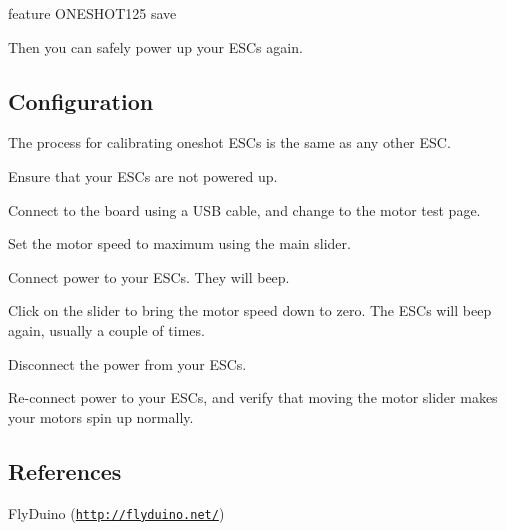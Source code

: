\begin{DoxyVerb}feature ONESHOT125
save
\end{DoxyVerb}


Then you can safely power up your E\+S\+Cs again.

\subsection*{Configuration}

The process for calibrating oneshot E\+S\+Cs is the same as any other E\+S\+C.


\begin{DoxyEnumerate}
\item Ensure that your E\+S\+Cs are not powered up.
\end{DoxyEnumerate}
\begin{DoxyEnumerate}
\item Connect to the board using a U\+S\+B cable, and change to the motor test page.
\end{DoxyEnumerate}
\begin{DoxyEnumerate}
\item Set the motor speed to maximum using the main slider.
\end{DoxyEnumerate}
\begin{DoxyEnumerate}
\item Connect power to your E\+S\+Cs. They will beep.
\end{DoxyEnumerate}
\begin{DoxyEnumerate}
\item Click on the slider to bring the motor speed down to zero. The E\+S\+Cs will beep again, usually a couple of times.
\end{DoxyEnumerate}
\begin{DoxyEnumerate}
\item Disconnect the power from your E\+S\+Cs.
\end{DoxyEnumerate}
\begin{DoxyEnumerate}
\item Re-\/connect power to your E\+S\+Cs, and verify that moving the motor slider makes your motors spin up normally.
\end{DoxyEnumerate}

\subsection*{References}


\begin{DoxyItemize}
\item Fly\+Duino (\href{http://flyduino.net/}{\tt http\+://flyduino.\+net/}) 
\end{DoxyItemize}